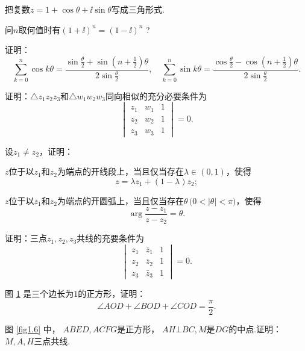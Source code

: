 \begin{xiti}\hypertarget{xiti1.2}{}
 \item 把复数$z=1+\cos\theta+\ii\sin\theta$写成三角形式.
 \item 问$n$取何值时有$(1+\ii)^n=(1-\ii)^n$ ?
 \item 证明：
  \[  \sum_{k=0}^n\cos k\theta=\frac{\sin\frac\theta2+\sin\left(n+\frac12\right)\theta}{2\sin\frac\theta2},\quad
  \sum_{k=0}^n\sin k\theta=\frac{\cos\frac\theta2-\cos\left(n+\frac12\right)\theta}{2\sin\frac\theta2}.\]
 \item 证明：$\triangle z_1z_2z_3$和$\triangle w_1w_2w_3$同向相似的充分必要条件为
  \[\begin{vmatrix}
   z_1&w_1&1\\z_2&w_2&1\\z_3&w_3&1
   \end{vmatrix}=0.\]
 \item 设$z_1\ne z_2$，证明：
  \begin{enuma}
   \item $z$位于以$z_1$和$z_2$为端点的开线段上，当且仅当存在$\lambda\in (0,1)$，使得
       \[z=\lambda z_1+(1-\lambda)z_2;\]
   \item $z$位于以$z_1$和$z_2$为端点的开圆弧上，当且仅当存在$\theta\,\big(0<|\theta|<\pi\big)$，使得
       \[\arg\frac{z-z_1}{z-z_2}=\theta.\]
  \end{enuma}
 \item 证明：三点$z_1,z_2,z_3$共线的充要条件为
   \[\begin{vmatrix}
       z_1&\bar z_1&1\\z_2&\bar z_2&1\\z_3&\bar z_3&1
   \end{vmatrix}=0.\]
 \item 图 \ref{fig1.5} 是三个边长为$1$的正方形，证明：
   \[\angle AOD+\angle BOD+\angle COD=\frac\pi2.\]
 \item 图 \ref{fig1.6} 中， $ABED,ACFG$是正方形， $AH\bot BC,M$是$DG$的中点.证明： $M,A,H$三点共线.
 \begin{figure}[!ht]
 \begin{minipage}[b]{0.48\textwidth}
   \centering
   \caption{}\label{fig1.5}
 \end{minipage}\hfill%

\end{figure}
\end{xiti}
